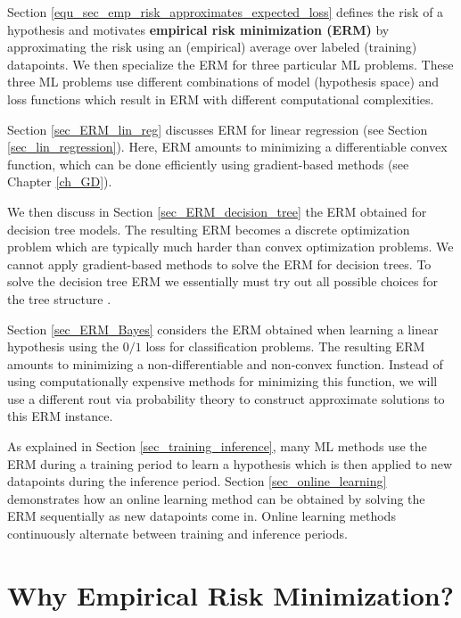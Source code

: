 \documentclass[12pt]{report}
\begin{document}
Section \eqref{equ_sec_emp_risk_approximates_expected_loss} defines the 
risk of a hypothesis and motivates {\bf empirical risk minimization (ERM)} 
by approximating the risk using an (empirical) average over labeled (training) datapoints. 
We then specialize the ERM for three particular ML problems. These three ML problems 
use different combinations of model (hypothesis space) and loss functions which result 
in ERM with different computational complexities. 

Section \ref{sec_ERM_lin_reg} discusses ERM for linear regression (see Section \ref{sec_lin_regression}). 
Here, ERM amounts to minimizing a differentiable convex function, which can be done efficiently 
using gradient-based methods (see Chapter \ref{ch_GD}). 

We then discuss in Section \ref{sec_ERM_decision_tree} the ERM 
obtained for decision tree models. The resulting ERM becomes a 
discrete optimization problem which are typically much harder than 
convex optimization problems. We cannot apply gradient-based methods 
to solve the ERM for decision trees. To solve the decision tree ERM we 
essentially must try out all possible choices for the tree structure \cite{Hyafil1976}. 

Section \ref{sec_ERM_Bayes} considers the ERM obtained when learning a linear hypothesis 
using the $0/1$ loss for classification problems. The resulting ERM 
amounts to minimizing a non-differentiable and non-convex function. 
Instead of using computationally expensive methods for minimizing 
this function, we will use a different rout via probability theory to 
construct approximate solutions to this ERM instance. 

As explained in Section \ref{sec_training_inference}, many ML methods 
use the ERM during a training period to learn a hypothesis which is 
then applied to new datapoints during the inference period. 
Section \ref{sec_online_learning} demonstrates how an online 
learning method can be obtained by solving the ERM sequentially 
as new datapoints come in. Online learning methods continuously 
alternate between training and inference periods. 



\section{Why Empirical Risk Minimization?} 
\label{equ_sec_emp_risk_approximates_expected_loss}
\end{document}

